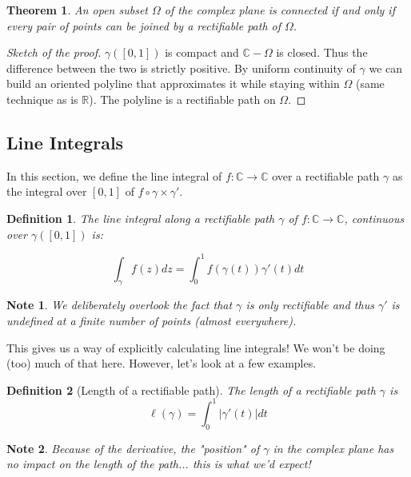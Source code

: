 \documentclass{article}
\newtheorem*{defi}{Definition}
\newtheorem*{note}{Note}
\newtheorem*{thm*}{Theorem}
\begin{document}
\begin{thm*}
    An open subset $\Omega$ of the complex plane is connected if and only if every pair of points can be joined by a rectifiable path of $\Omega$.
\end{thm*}

\begin{proof}[Sketch of the proof]
    $\gamma([0,1])$ is compact and $\mathbb{C} - \Omega$ is closed. Thus the difference between the two is strictly positive. By uniform continuity of $\gamma$ we can build an oriented polyline that approximates it while staying within $\Omega$ (same technique as is $\mathbb{R}$). The polyline is a rectifiable path on $\Omega$.
\end{proof}

\subsection{Line Integrals}
In this section, we define the line integral of $f:\mathbb{C} \rightarrow \mathbb{C}$ over a rectifiable path $\gamma$ as the integral over $[0,1]$ of $f\circ\gamma \times \gamma'$.

\begin{defi}
    The line integral along a rectifiable path $\gamma$ of $f:\mathbb{C} \rightarrow \mathbb{C}$, continuous over $\gamma([0,1])$ is:

    $$ \int_\gamma f(z)dz = \int_0^1 f(\gamma(t))\gamma'(t)dt$$
\end{defi}

\begin{note}
    We deliberately overlook the fact that $\gamma$ is only rectifiable and thus $\gamma'$ is undefined at a finite number of points (almost everywhere). 
\end{note}

This gives us a way of explicitly calculating line integrals! We won't be doing (too) much of that here. However, let's look at a few examples.

\begin{defi}[Length of a rectifiable path]
    The length of a rectifiable path $\gamma$ is 
    $$ \ell(\gamma) = \int_0^1 |\gamma'(t)|dt$$
\end{defi}

\begin{note}
    Because of the derivative, the "position" of $\gamma$ in the complex plane has no impact on the length of the path... this is what we'd expect!
\end{note}
\end{document}
